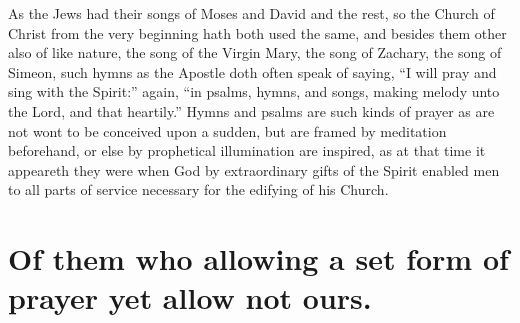 As the Jews had their songs of Moses and David and the rest, so the Church of Christ from the very beginning hath both used the same, and besides them other also of like nature, the song of the Virgin Mary, the song of Zachary,  the song of Simeon, such hymns as the Apostle doth often speak of saying, “I will pray and sing with the Spirit:” again, “in psalms, hymns, and songs, making melody unto the Lord, and that heartily.” Hymns and psalms are such kinds of prayer as are not wont to be conceived upon a sudden, but are framed by meditation beforehand, or else by prophetical illumination are inspired, as at that time it appeareth they were when God by extraordinary gifts of the Spirit enabled men to all parts of service necessary for the edifying of his Church.

\section*{Of them who allowing a set form of prayer yet allow not ours.}

